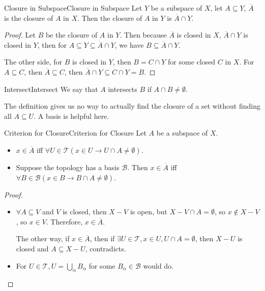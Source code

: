 \documentclass[../main.tex]{subfiles}
\begin{document}
\begin{theorem}{Closure in Subspace}{Closure in Subspace}
Let $Y$ be a subspace of $X$, let $A \subseteq Y$, $\overline{A}$ is the closure of $A$ in $X$. Then the closure of $A$ in $Y$ is $\overline{A}\cap Y$.
\end{theorem}
\begin{proof}
Let $B$ be the closure of $A$ in $Y$. Then  because $\overline{A}$ is closed in $X$, $\overline{A}\cap Y$ is closed in $Y$, then for $A \subseteq Y \subseteq \overline{A}\cap Y$, we have $B \subseteq \overline{A}\cap Y$.

The other side, for $B$ is closed in $Y$, then $B = C \cap Y$ for some closed $C$ in $X$. For $A \subseteq C$, then $\overline{A} \subseteq C$, then $\overline{A}\cap Y \subseteq C\cap Y = B$.
\end{proof}

\begin{notation}{Intersect}{Intersect}
We say that $A$ intersects $B$ if $A\cap B\neq \emptyset $.
\end{notation}

The definition gives us no way to actually find the closure of a set without finding all $A \subseteq U$. A basis is helpful here.

\begin{theorem}{Criterion for Closure}{Criterion for Closure}
Let $A$ be a subspace of $X$.
\begin{itemize}
\item $x\in \overline{A}$ iff $\forall U\in \mathcal{T} (x\in U \rightarrow U\cap A \neq \emptyset )$.
\item Suppose the topology has a basis $\mathcal{B}$. Then $x\in \overline{A}$ iff $\forall B\in \mathcal{B}(x\in B \rightarrow B\cap A\neq \emptyset )$.
\end{itemize}
\end{theorem}
\begin{proof}
\begin{itemize}
	\item $\forall A \subseteq V$ and $V$ is closed, then $X-V$ is open, but $X-V\cap A = \emptyset $, so $x\notin X-V$, so $x\in V$. Therefore, $x\in \overline{A}$.

	The other way, if $x\in \overline{A}$, then if $\exists U\in \mathcal{T}, x\in U, U\cap A = \emptyset $, then $X-U$ is closed and $A \subseteq X-U$, contradicts.
	\item For $U\in \mathcal{T}, U = \bigcup_{\alpha} B_{\alpha} $ for some $B_{\alpha}\in \mathcal{B}$ would do.
\end{itemize}
\end{proof}
\end{document}
